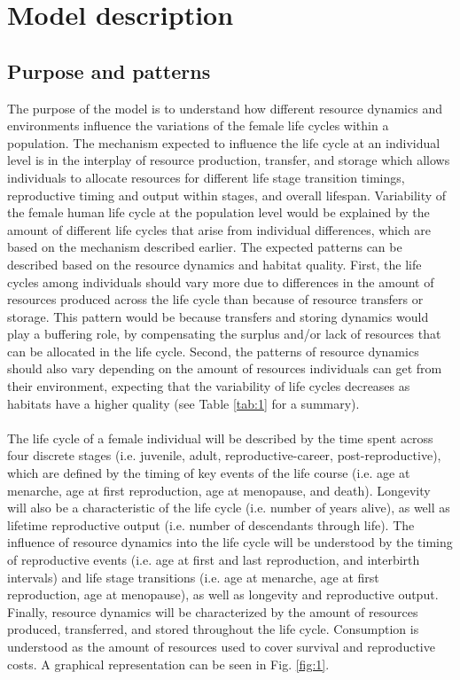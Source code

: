 \documentclass{article}
\begin{document}
\section{Model description}

\subsection{Purpose and patterns}

The purpose of the model is to understand how different resource dynamics and environments influence the variations of the female life cycles within a population. The mechanism expected to influence the life cycle at an individual level is in the interplay of resource production, transfer, and storage which allows individuals to allocate resources for different life stage transition timings, reproductive timing and output within stages, and overall lifespan. Variability of the female human life cycle at the population level would be explained by the amount of different life cycles that arise from individual differences, which are based on the mechanism described earlier. The expected patterns can be described based on the resource dynamics and habitat quality. First, the life cycles among individuals should vary more due to differences in the amount of resources produced across the life cycle than because of resource transfers or storage. This pattern would be because transfers and storing dynamics would play a buffering role, by compensating the surplus and/or lack of resources that can be allocated in the life cycle. Second, the patterns of resource dynamics should also vary depending on the amount of resources individuals can get from their environment, expecting that the variability of life cycles decreases as habitats have a higher quality (see Table \ref{tab:1} for a summary).
\\\\
The life cycle of a female individual will be described by the time spent across four discrete stages (i.e. juvenile, adult, reproductive-career, post-reproductive), which are defined by the timing of key events of the life course (i.e. age at menarche, age at first reproduction, age at menopause, and death). Longevity will also be a characteristic of the life cycle (i.e. number of years alive), as well as lifetime reproductive output (i.e. number of descendants through life). The influence of resource dynamics into the life cycle will be understood by the timing of reproductive events (i.e. age at first and last reproduction, and interbirth intervals) and life stage transitions (i.e. age at menarche, age at first reproduction, age at menopause), as well as longevity and reproductive output. Finally, resource dynamics will be characterized by the amount of resources produced, transferred, and stored throughout the life cycle. Consumption is understood as the amount of resources used to cover survival and reproductive costs. A graphical representation can be seen in Fig. \ref{fig:1}.
\end{document}
